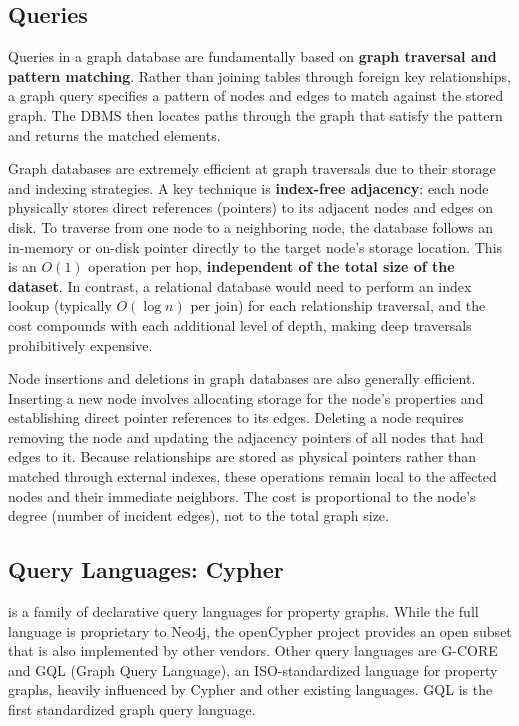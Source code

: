 \subsection{Queries}

Queries in a graph database are fundamentally based on \textbf{graph traversal and pattern matching}. Rather than joining tables through foreign key relationships, a graph query specifies a pattern of nodes and edges to match against the stored graph. The DBMS then locates paths through the graph that satisfy the pattern and returns the matched elements.

Graph databases are extremely efficient at graph traversals due to their storage and indexing strategies. 
A key technique is \textbf{index-free adjacency}: each node physically stores direct references (pointers) to its adjacent nodes and edges on disk. 
To traverse from one node to a neighboring node, the database follows an in-memory or on-disk pointer directly to the target node's storage location. 
This is an \(O(1)\) operation per hop, \textbf{independent of the total size of the dataset}. 
In contrast, a relational database would need to perform an index lookup (typically \(O(\log n)\) per join) for each relationship traversal, and the cost compounds with each additional level of depth, making deep traversals prohibitively expensive.

Node insertions and deletions in graph databases are also generally efficient. 
Inserting a new node involves allocating storage for the node's properties and establishing direct pointer references to its edges. 
Deleting a node requires removing the node and updating the adjacency pointers of all nodes that had edges to it. 
Because relationships are stored as physical pointers rather than matched through external indexes, these operations remain local to the affected nodes and their immediate neighbors. 
The cost is proportional to the node's degree (number of incident edges), not to the total graph size.

\subsection{Query Languages: Cypher}

 is a family of declarative query languages for property graphs. While the full language is proprietary to Neo4j, the openCypher project provides an open subset that is also implemented by other vendors.
Other query languages are G-CORE and GQL (Graph Query Language), an ISO-standardized language for property graphs, heavily influenced by Cypher and other existing languages. GQL is the first standardized graph query language.

